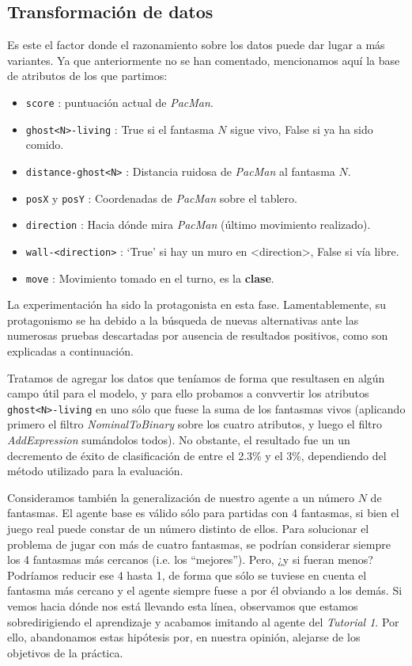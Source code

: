 \documentclass[12pt]{article}
\begin{document}
\subsection{Transformación de datos}

Es este el factor donde el razonamiento sobre los datos puede dar lugar a más variantes. Ya que anteriormente no se han comentado, mencionamos aquí la base de atributos de los que partimos:
\begin{itemize}
    \item \texttt{score} : puntuación actual de \emph{PacMan}.
    \item \texttt{ghost<N>-living} : True si el fantasma $N$ sigue vivo, False si ya ha sido comido.
    \item \texttt{distance-ghost<N>} : Distancia ruidosa de \emph{PacMan} al fantasma $N$.
    \item \texttt{posX} y \texttt{posY} : Coordenadas de \emph{PacMan} sobre el tablero.
    \item \texttt{direction} : Hacia dónde mira \emph{PacMan} (último movimiento realizado).
    \item \texttt{wall-<direction>} : `True' si hay un muro en \textless direction\textgreater, False si vía libre.
    \item \texttt{move} : Movimiento tomado en el turno, es la \textbf{clase}.
\end{itemize}

La experimentación ha sido la protagonista en esta fase. Lamentablemente, su protagonismo se ha debido a la búsqueda de nuevas alternativas ante las numerosas pruebas descartadas por ausencia de resultados positivos, como son explicadas a continuación.

\vspace{0.2cm}

Tratamos de agregar los datos que teníamos de forma que resultasen en algún campo útil para el modelo, y para ello probamos a convvertir los atributos \texttt{ghost<N>-living} en uno sólo que fuese la suma de los fantasmas vivos (aplicando primero el filtro \emph{NominalToBinary} sobre los cuatro atributos, y luego el filtro \emph{AddExpression} sumándolos todos). No obstante, el resultado fue un un decremento de éxito de clasificación de entre el 2.3\% y el 3\%, dependiendo del método utilizado para la evaluación.

\vspace{0.2cm}

Consideramos también la generalización de nuestro agente a un número $N$ de fantasmas. El agente base es válido sólo para partidas con 4 fantasmas, si bien el juego real puede constar de un número distinto de ellos. Para solucionar el problema de jugar con más de cuatro fantasmas, se podrían considerar siempre los 4 fantasmas más cercanos (i.e. los ``mejores''). Pero, ¿y si fueran menos? Podríamos reducir ese 4 hasta 1, de forma que sólo se tuviese en cuenta el fantasma más cercano y el agente siempre fuese a por él obviando a los demás. Si vemos hacia dónde nos está llevando esta línea, observamos que estamos sobredirigiendo el aprendizaje y acabamos imitando al agente del \emph{Tutorial 1}. Por ello, abandonamos estas hipótesis por, en nuestra opinión, alejarse de los objetivos de la práctica.
\end{document}
